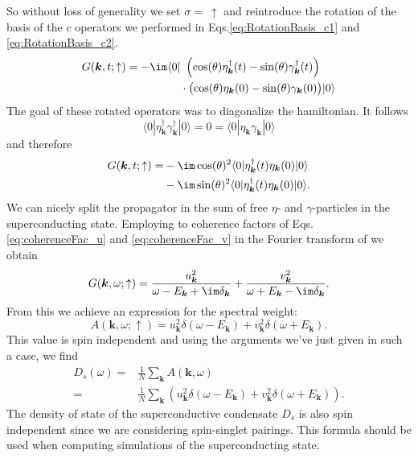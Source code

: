 \documentclass[../main.tex]{subfile}
\begin{document}
So without loss of generality we set $\sigma = ~ \uparrow$ and reintroduce the rotation of the basis of the $c$ operators 
we performed in Eqs.\ref{eq:RotationBasis_c1} and \ref{eq:RotationBasis_c2}.
\begin{align*}
    G(\bm{k},t; \uparrow) = -\im \langle 0 |&~\left(\cos(\theta) \eta_{\bm{k}}^{\dagger}(t) - \sin(\theta) \gamma_{\bm{k}}^{\dagger}(t)\right)\\
    &\cdot\bigl(\cos(\theta) \eta_{\bm{k}}(0) - \sin(\theta) \gamma_{\bm{k}}(0)\bigr) | 0 \rangle
\end{align*}
The goal of these rotated operators was to diagonalize the hamiltonian. It follows
\[
    \langle 0|\eta_{\bm{k}}^{\dagger}\gamma_{\bm{k}}^{\dagger} | 0\rangle = 0 =  \langle 0|\eta_{\bm{k}}\gamma_{\bm{k}} | 0\rangle
\] 
and therefore
\begin{equation}
    \begin{aligned}
        G(\bm{k},t; \uparrow) =& -\im \cos(\theta)^2 \langle 0 | \eta_{\bm{k}}^{\dagger}(t)\eta_{\bm{k}}(0) | 0 \rangle \\
        & -\im\sin(\theta)^2 \langle 0 | \eta_{\bm{k}}^{\dagger}(t)\eta_{\bm{k}}(0) | 0 \rangle .
    \end{aligned}
\end{equation}
We can nicely split the propagator in the sum of free $\eta$- and $\gamma$-particles in the superconducting state.
Employing to coherence factors of Eqs.\ref{eq:coherenceFac_u} and \ref{eq:coherenceFac_v} in the Fourier transform of we obtain
\[
    G(\bm{k}, \omega; \uparrow) = \frac{u_{\bm{k}}^2}{\omega - E_{\bm{k}} + \im\delta_{\bm{k}}} + \frac{v_{\bm{k}}^2}{\omega + E_{\bm{k}} - \im\delta_{\bm{k}}}.
\]
From this we achieve an expression for the spectral weight:
\[
    A(\bm{k}, \omega; \uparrow) = u^2_{\bm{k}}\delta(\omega - E_{\bm{k}}) + v^2_{\bm{k}}\delta(\omega + E_{\bm{k}}).
\]
This value is spin independent and using the arguments we've just given in such a case, we find
\begin{align*}
    D_s(\omega) =& \frac{1}{N} \sum_{\bm{k}} A(\bm{k},\omega)\\
        =& \frac{1}{N} \sum_{\bm{k}} \left(u^2_{\bm{k}}\delta(\omega - E_{\bm{k}}) + v^2_{\bm{k}}\delta(\omega + E_{\bm{k}})\right).
\end{align*}
The density of state of the superconductive condensate $D_s$ is also spin independent since we are considering spin-singlet pairings. This formula should be used
when computing simulations of the superconducting state.\\ 
\end{document}
